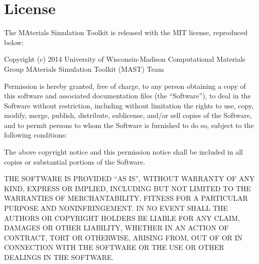 \documentclass[letterpaper,10pt,english]{sphinxmanual}
\begin{document}
\chapter{License}
\label{11_0_license::doc}\label{11_0_license:license}
The MAterials Simulation Toolkit is released with the MIT license, reproduced below:

Copyright (c) 2014 University of Wisconsin-Madison Computational Materials Group MAterials Simulation Toolkit (MAST) Team

Permission is hereby granted, free of charge, to any person obtaining a copy
of this software and associated documentation files (the ``Software''), to deal
in the Software without restriction, including without limitation the rights
to use, copy, modify, merge, publish, distribute, sublicense, and/or sell
copies of the Software, and to permit persons to whom the Software is
furnished to do so, subject to the following conditions:

The above copyright notice and this permission notice shall be included in
all copies or substantial portions of the Software.

THE SOFTWARE IS PROVIDED ``AS IS'', WITHOUT WARRANTY OF ANY KIND, EXPRESS OR
IMPLIED, INCLUDING BUT NOT LIMITED TO THE WARRANTIES OF MERCHANTABILITY,
FITNESS FOR A PARTICULAR PURPOSE AND NONINFRINGEMENT. IN NO EVENT SHALL THE
AUTHORS OR COPYRIGHT HOLDERS BE LIABLE FOR ANY CLAIM, DAMAGES OR OTHER
LIABILITY, WHETHER IN AN ACTION OF CONTRACT, TORT OR OTHERWISE, ARISING FROM,
OUT OF OR IN CONNECTION WITH THE SOFTWARE OR THE USE OR OTHER DEALINGS IN
THE SOFTWARE.



\renewcommand{\indexname}{Index}
\printindex
\end{document}
